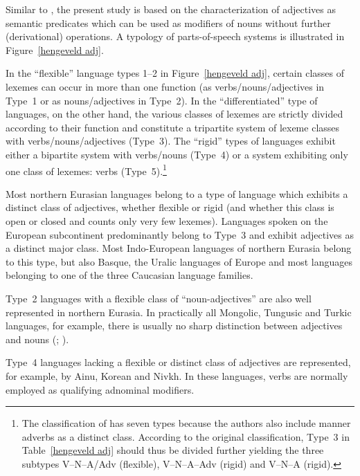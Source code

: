Similar to \citet{hengeveld-etal2004}, the present study is based on the characterization of adjectives as semantic predicates which can be used as modifiers of nouns without further (derivational) operations. A typology of parts-of-speech systems is illustrated in Figure~\ref{hengeveld adj}.

In the “flexible” language types 1–2 in Figure~\ref{hengeveld adj}, certain classes of lexemes can occur in more than one function (as verbs/nouns/adjectives in Type~1 or as nouns/adjectives in Type~2). In the “differentiated” type of languages, on the other hand, the various classes of lexemes are strictly divided according to their function and constitute a tripartite system of lexeme classes with verbs\slash{}nouns\slash{}adjectives (Type~3). The “rigid” types of languages exhibit either a bipartite system with verbs/nouns (Type~4) or a system exhibiting only one class of lexemes: verbs (Type~5).\footnote{The classification of \citet{hengeveld-etal2004} has seven types because the authors also include manner adverbs as a distinct class. According to the original classification, Type~3 in Table~\ref{hengeveld adj} should thus be divided further yielding the three subtypes V–N–A/Adv (flexible), V–N–A–Adv (rigid) and V–N–A (rigid).}

Most northern Eurasian languages belong to a type of language which exhibits a distinct class of adjectives, whether flexible or rigid (and whether this class is open or closed and counts only very few lexemes). Languages spoken on the European subcontinent predominantly belong to Type~3 and exhibit adjectives as a distinct major class. Most Indo-European languages of northern Eurasia belong to this type, but also Basque, the Uralic languages of Europe and most languages belonging to one of the three Caucasian language families.

Type~2 languages with a flexible class of “noun-adjectives” are also well represented in northern Eurasia. In practically all Mongolic, Tungusic and Turkic languages, for example, there is usually no sharp distinction between adjectives and nouns (\citealt[122–123]{rijkhoff2002}; \citealt[9]{poppe1964}).

Type~4 languages lacking a flexible or distinct class of adjectives are represented, for example, by Ainu, Korean and Nivkh. In these languages, verbs are normally employed as qualifying adnominal modifiers.

